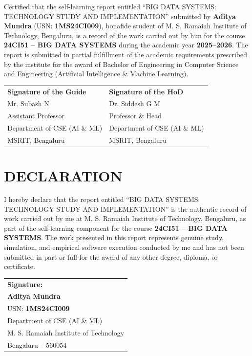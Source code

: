 \documentclass[12pt,a4paper]{report}
\newcommand{\ProjectTitle}{BIG DATA SYSTEMS: TECHNOLOGY STUDY AND IMPLEMENTATION}
\newcommand{\CourseCode}{24CI51 -- BIG DATA SYSTEMS}
\newcommand{\AcademicYear}{2025--2026}
\newcommand{\StudentOne}{Aditya Mundra}
\newcommand{\USNOne}{1MS24CI009}
\newcommand{\GuideOne}{Mr. Subash N}
\newcommand{\GuideDesignation}{Assistant Professor}
\newcommand{\HOD}{Dr. Siddesh G M}
\newcommand{\HODDesignation}{Professor \& Head}
\begin{document}
Certified that the self-learning report entitled ``\ProjectTitle'' submitted by \textbf{\StudentOne} (USN: \textbf{\USNOne}), bonafide student of M. S. Ramaiah Institute of Technology, Bengaluru, is a record of the work carried out by him for the course \textbf{\CourseCode} during the academic year \textbf{\AcademicYear}. The report is submitted in partial fulfillment of the academic requirements prescribed by the institute for the award of Bachelor of Engineering in Computer Science and Engineering (Artificial Intelligence \& Machine Learning).

\vspace{2.5cm}

\begin{tabularx}{\textwidth}{X X}
\centering \textbf{Signature of the Guide} &
\centering\arraybackslash \textbf{Signature of the HoD}\\[0.5cm]
\centering \GuideOne &
\centering\arraybackslash \HOD\\
\centering \GuideDesignation &
\centering\arraybackslash \HODDesignation\\
\centering Department of CSE (AI \& ML) &
\centering\arraybackslash Department of CSE (AI \& ML)\\
\centering MSRIT, Bengaluru &
\centering\arraybackslash MSRIT, Bengaluru\\
\end{tabularx}

\clearpage

\chapter*{DECLARATION}

I hereby declare that the report entitled ``\ProjectTitle'' is the authentic record of work carried out by me at M. S. Ramaiah Institute of Technology, Bengaluru, as part of the self-learning component for the course \textbf{\CourseCode}. The work presented in this report represents genuine study, simulation, and empirical software execution conducted by me and has not been submitted in part or full for the award of any other degree, diploma, or certificate.

\vspace{2.5cm}

\begin{flushright}
\begin{tabular}{l}
\textbf{Signature:}\\[1.0cm]
\textbf{\StudentOne}\\
USN: \textbf{\USNOne}\\
Department of CSE (AI \& ML)\\
M. S. Ramaiah Institute of Technology\\
Bengaluru -- 560054
\end{tabular}
\end{flushright}
\end{document}

